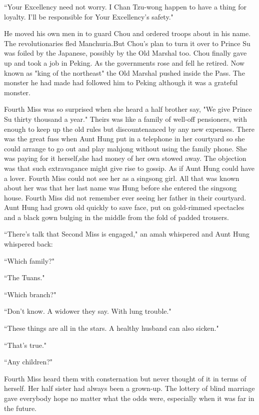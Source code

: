 \par ``Your Excellency need not worry. I Chan Tzu-wong happen to have a thing for loyalty. I'll be responsible for Your Excellency's safety."
\par He moved his own men in to guard Chou and ordered troops about in his name. The revolutionaries fled Manchuria.But Chou's plan to turn it over to Prince Su was foiled by the Japanese, possibly by the Old Marshal too. Chou finally gave up and took a job in Peking. As the governments rose and fell he retired. Now known as "king of the northeast" the Old Marshal pushed inside the Pass. The monster he had made had followed him to Peking although it was a grateful monster.
\par Fourth Miss was so surprised when she heard a half brother say, "We give Prince Su thirty thousand a year." Theirs was like a family of well-off pensioners, with enough to keep up the old rules but discountenanced by any new expenses. There was the great fuss when Aunt Hung put in a telephone in her courtyard so she could arrange to go out and play mahjong without using the family phone. She was paying for it herself,she had money of her own stowed away. The objection was that such extravagance might give rise to gossip. As if Aunt Hung could have a lover. Fourth Miss could not see her as a singsong girl. All that was known about her was that her last name was Hung before she entered the singsong house. Fourth Miss did not remember ever seeing her father in their courtyard. Aunt Hung had grown old quickly to save face, put on gold-rimmed spectacles and a black gown bulging in the middle from the fold of padded trousers.
\par ``There's talk that Second Miss is engaged," an amah whispered and Aunt Hung whispered back:
\par ``Which family?"
\par ``The Tuans."
\par ``Which branch?"
\par ``Don't know. A widower they say. With lung trouble."
\par ``These things are all in the stars. A healthy husband can also sicken."
\par ``That's true."
\par ``Any children?"
\par Fourth Miss heard them with consternation but never thought of it in terms of herself. Her half sister had always been a grown-up. The lottery of blind marriage gave everybody hope no matter what the odds were, especially when it was far in the future.

